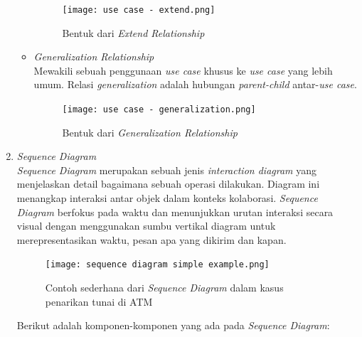 \documentclass[a4paper]{article}
\begin{document}
\begin{enumerate}
\begin{itemize}
\begin{figure}[h]
            \centering
            \texttt{[image: use case - extend.png]}
            \caption{Bentuk dari \textit{Extend Relationship}}
        \end{figure}
        \item \textit{Generalization Relationship}\\
        Mewakili sebuah penggunaan \textit{use case} khusus ke \textit{use case} yang lebih umum\autocite{systemanalysisdesign-use-case-diagram}. Relasi \textit{generalization} adalah hubungan \textit{parent-child} antar-\textit{use case}\autocite{what-is-usecase-diagram}.
        \begin{figure}[h]
            \centering
            \texttt{[image: use case - generalization.png]}
            \caption{Bentuk dari \textit{Generalization Relationship}}
        \end{figure}
    \end{itemize}
    \item \textit{Sequence Diagram}\\
    \textit{Sequence Diagram} merupakan sebuah jenis \textit{interaction diagram} yang menjelaskan detail bagaimana sebuah operasi dilakukan. Diagram ini menangkap interaksi antar objek dalam konteks kolaborasi. \textit{Sequence Diagram} berfokus pada waktu dan menunjukkan urutan interaksi secara visual dengan menggunakan sumbu vertikal diagram untuk merepresentasikan waktu, pesan apa yang dikirim dan kapan\autocite{what-is-sequence-diagram}.
    
    \begin{figure}[h]
        \centering
        \texttt{[image: sequence diagram simple example.png]}
        \caption{Contoh sederhana dari \textit{Sequence Diagram} dalam kasus penarikan tunai di ATM}
    \end{figure}
    \newpage
    Berikut adalah komponen-komponen yang ada pada \textit{Sequence Diagram}:
    

\end{enumerate}
\end{document}
